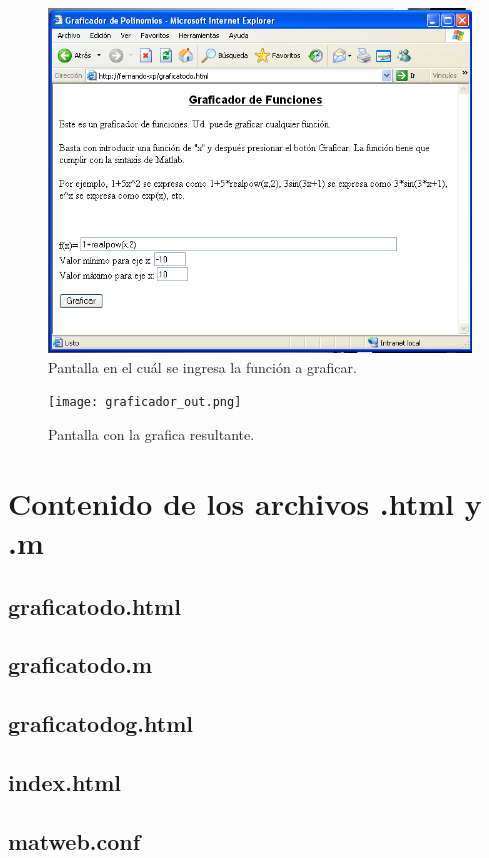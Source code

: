 \documentclass[12pt,letterpaper]{article}
\begin{document}
\begin{multicols}{2}
\begin{figure}[H]
\centering
\includegraphics[width = \columnwidth]{graficador_in.png}
\caption{Pantalla en el cuál se ingresa la función a graficar.}
\label{graficador_in}
\end{figure}

\begin{figure}[H]
\centering
\texttt{[image: graficador\_out.png]}
\caption{Pantalla con la grafica resultante.}
\label{graficador_out}
\end{figure}

\end{multicols}
\balance

\section{Contenido de los archivos .html y .m}

\subsection{graficatodo.html}



\subsection{graficatodo.m}



\subsection{graficatodog.html}



\subsection{index.html}



\subsection{matweb.conf}


\end{document}
